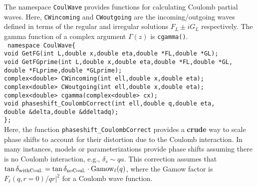 \documentclass[10pt]{article}
\def\tab{\hspace*{9pt}}
\begin{document}
The namespace {\tt CoulWave} provides functions for calculating Coulomb partial waves. Here, {\tt CWincoming} and {\tt CWoutgoing} are the incoming/outgoing waves defined in terms of the regular and irregular solutions $F_L\pm iG_L$ respectively. The gamma function of a complex argument $\Gamma(z)$ is {\tt cgamma()}.\\
{\tt
namespace CoulWave\{\\
\tab void GetFG(int L,double x,double eta,double *FL,double *GL);\\
\tab void GetFGprime(int L,double x,double eta,double *FL,double *GL,\\
\tab \tab double *FLprime,double *GLprime);\\
\tab complex<double> CWincoming(int ell,double x,double eta);\\
\tab complex<double> CWoutgoing(int ell,double x,double eta);\\
\tab complex<double> cgamma(complex<double> cx);\\
\tab void phaseshift\_CoulombCorrect(int ell,double q,double eta,\\
					\tab \tab double \&delta,double \&ddeltadq);\\
\};}\\ \noindent
Here, the function {\tt phaseshift\_CoulombCorrect} provides a {\bf crude} way to scale phase shifts to account for their distortion due to the Coulomb interaction. In many instances, models or parameterizations provide phase shifts assuming there is no Coulomb interaction, e.g., $\delta_s\sim qa$. This correction assumes that $\tan\delta_{\rm with Coul.}=\tan\delta_{\rm no Coul.}\cdot{\rm Gamow}_\ell(q)$, where the Gamow factor is $F_\ell(q,r=0)/qr|^2$ for a Coulomb wave function.
\end{document}
